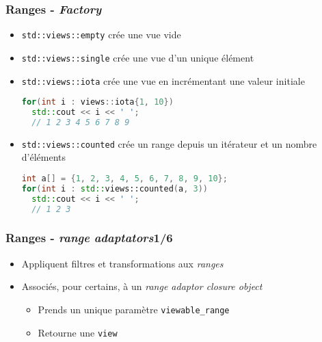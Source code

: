 \documentclass[C++.tex]{subfiles}
\begin{document}
\begin{frame}[fragile]
	\frametitle{Ranges - \textit{Factory}}
	\begin{itemize}
		\item \lstinline|std::views::empty| crée une vue vide
		\item \lstinline|std::views::single| crée une vue d'un unique élément
		\item \lstinline|std::views::iota| crée une vue en incrémentant une valeur initiale
	
		\begin{lstlisting}[language=C++]
for(int i : views::iota{1, 10})
  std::cout << i << ' ';
  // 1 2 3 4 5 6 7 8 9\end{lstlisting}
	
		\item \lstinline|std::views::counted| crée un range depuis un itérateur et un nombre d'éléments
	
		\begin{lstlisting}[language=C++]
int a[] = {1, 2, 3, 4, 5, 6, 7, 8, 9, 10};
for(int i : std::views::counted(a, 3))
  std::cout << i << ' ';
  // 1 2 3\end{lstlisting}
	\end{itemize}
\end{frame}

\begin{frame}[fragile]
	\frametitle{Ranges - \textit{range adaptators}\titlehfill{}1/6}
	\begin{itemize}
		\item Appliquent filtres et transformations aux \textit{ranges}
		\item Associés, pour certains, à un \textit{range adaptor closure object}
		\begin{itemize}
			\item Prends un unique paramètre \lstinline|viewable_range|
			\item Retourne une \lstinline|view|
		\end{itemize}
	\end{itemize}
\end{frame}
\end{document}
